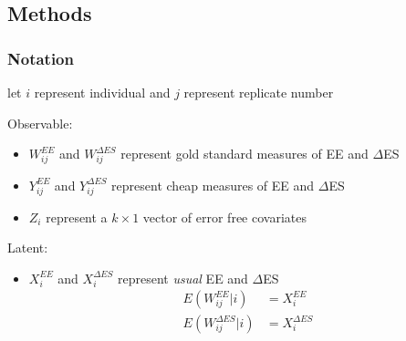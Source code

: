 \documentclass[handout]{beamer}\usepackage[]{graphicx}\usepackage[]{color}
\begin{document}
\subsection{Methods}

\begin{frame}
\frametitle{Notation}
let $i$ represent individual and $j$ represent replicate number \\

\vspace{0.3cm}

Observable:
\begin{itemize}
\item
$W_{ij}^{EE}$ and $W_{ij}^{\Delta ES}$ represent gold standard measures of EE and $\Delta$ES
\item
$Y_{ij}^{EE}$ and $Y_{ij}^{\Delta ES}$ represent cheap measures of EE and $\Delta$ES
\item
$Z_i$ represent a $k\times 1$ vector of error free covariates
\end{itemize}

\vspace{0.2cm}

Latent:
\begin{itemize}
\item
$X_{i}^{EE}$ and $X_{i}^{\Delta ES}$ represent \emph{usual} EE and $\Delta$ES \\

\begin{align*}
E(W_{ij}^{EE}|i) &= X_i^{EE}\\
E(W_{ij}^{\Delta ES}|i) &= X_i^{\Delta ES}
\end{align*}

\end{itemize}

\end{frame}
\end{document}
